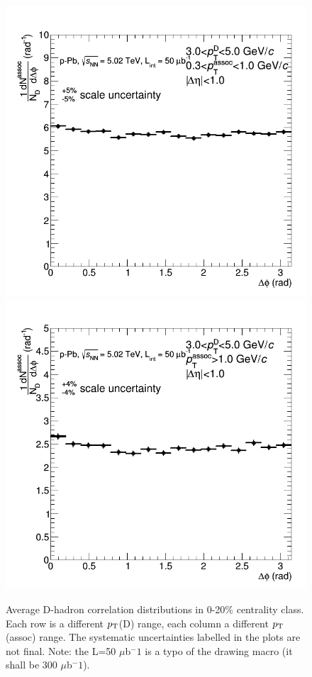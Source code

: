 \begin{figure}
{\includegraphics[width=0.32\linewidth]{figuresVsCent/Averages/020/CanvaAndVariedHistoWeightedAverageDzeroDstarDplus_pPb_Pt3to5assocPt03to1.png}}
{\includegraphics[width=0.32\linewidth]{figuresVsCent/Averages/020/CanvaAndVariedHistoWeightedAverageDzeroDstarDplus_pPb_Pt3to5assocPt1to99.png}}
 \caption{Average D-hadron correlation distributions in 0-20\% centrality class. Each row is a different $p_{\rm T}$(D) range, each column a different $p_{\rm T}$(assoc) range. The systematic uncertainties labelled in the plots are not final. Note: the L=50 $\mu$b$^-1$ is a typo of the drawing macro (it shall be 300 $\mu$b$^-1$).}
\label{fig:avgcorr020}
\end{figure}

